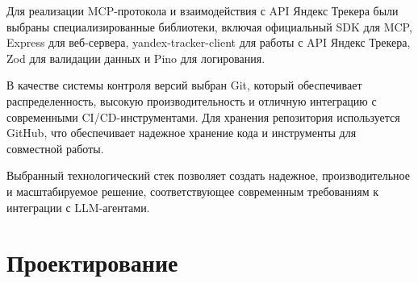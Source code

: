 \documentclass[utf8, russian]{eskdtext}
\let\stdsection\section
\renewcommand \section{\newpage\stdsection}
\begin{document}
Для реализации MCP-протокола и взаимодействия с API Яндекс Трекера были выбраны специализированные библиотеки, включая официальный SDK для MCP, Express для веб-сервера, yandex-tracker-client для работы с API Яндекс Трекера, Zod для валидации данных и Pino для логирования. 

В качестве системы контроля версий выбран Git, который обеспечивает распределенность, высокую производительность и отличную интеграцию с современными CI/CD-инструментами. Для хранения репозитория используется GitHub, что обеспечивает надежное хранение кода и инструменты для совместной работы.

Выбранный технологический стек позволяет создать надежное, производительное и масштабируемое решение, соответствующее современным требованиям к интеграции с LLM-агентами.

\section{Проектирование}
\end{document}
